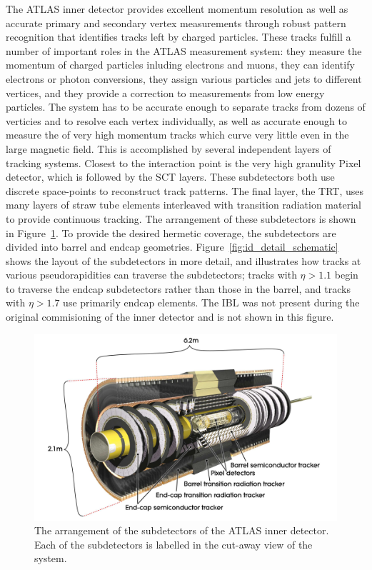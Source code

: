 The \ac{ATLAS} inner detector provides excellent momentum resolution as well as accurate primary and secondary vertex measurements through robust pattern recognition that identifies tracks left by charged particles. 
These tracks fulfill a number of important roles in the \ac{ATLAS} measurement system: they measure the momentum of charged particles inluding electrons and muons, they can identify electrons or photon conversions, they assign various particles and jets to different vertices, and they provide a correction to \met measurements from low energy particles. 
The system has to be accurate enough to separate tracks from dozens of verticies and to resolve each vertex individually, as well as accurate enough to measure the \pt of very high momentum tracks which curve very little even in the large magnetic field.
This is accomplished by several independent layers of tracking systems.
Closest to the interaction point is the very high granulity Pixel detector, which is followed by the \ac{SCT} layers.
These subdetectors both use discrete space-points to reconstruct track patterns.
The final layer, the \ac{TRT}, uses many layers of straw tube elements interleaved with transition radiation material to provide continuous tracking.
The arrangement of these subdetectors is shown in Figure~\ref{fig:id_overview}.
To provide the desired hermetic coverage, the subdetectors are divided into barrel and endcap geometries.
Figure~\ref{fig:id_detail_schematic} shows the layout of the subdetectors in more detail, and illustrates how tracks at various pseudorapidities can traverse the subdetectors; tracks with $\eta > 1.1$ begin to traverse the endcap subdetectors rather than those in the barrel, and tracks with $\eta > 1.7$ use primarily endcap elements. 
The \ac{IBL} was not present during the original commisioning of the inner detector and is not shown in this figure.

\begin{figure}[hbtp]
\includegraphics[width=\fullfig]{figures/id_overview.pdf}
\caption{The arrangement of the subdetectors of the \ac{ATLAS} inner detector. Each of the subdetectors is labelled in the cut-away view of the system.}
\label{fig:id_overview}
\end{figure}

